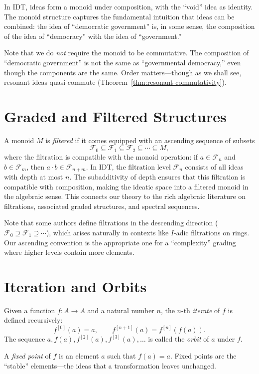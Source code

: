 \documentclass[11pt,openany]{book}
\theoremstyle{definition}
\theoremstyle{plain}
\theoremstyle{remark}
\newcommand{\Filt}[1]{\mathcal{F}_{#1}}     %
\begin{document}
In IDT, ideas form a monoid under composition, with the ``void'' idea as identity. The monoid structure captures the fundamental intuition that ideas can be combined: the idea of ``democratic government'' is, in some sense, the composition of the idea of ``democracy'' with the idea of ``government.''

Note that we do \emph{not} require the monoid to be commutative. The composition of ``democratic government'' is not the same as ``governmental democracy,'' even though the components are the same. Order matters---though as we shall see, resonant ideas quasi-commute (Theorem~\ref{thm:resonant-commutativity}).

\section{Graded and Filtered Structures}

A monoid $M$ is \emph{filtered} if it comes equipped with an ascending sequence of subsets
\[
\Filt{0} \subseteq \Filt{1} \subseteq \Filt{2} \subseteq \cdots \subseteq M,
\]
where the filtration is compatible with the monoid operation: if $a \in \Filt{n}$ and $b \in \Filt{m}$, then $a \cdot b \in \Filt{n+m}$. In IDT, the filtration level $\Filt{n}$ consists of all ideas with depth at most $n$. The subadditivity of depth ensures that this filtration is compatible with composition, making the ideatic space into a filtered monoid in the algebraic sense. This connects our theory to the rich algebraic literature on filtrations, associated graded structures, and spectral sequences.

Note that some authors define filtrations in the descending direction ($\Filt{0} \supseteq \Filt{1} \supseteq \cdots$), which arises naturally in contexts like $I$-adic filtrations on rings. Our ascending convention is the appropriate one for a ``complexity'' grading where higher levels contain more elements.

\section{Iteration and Orbits}

Given a function $f : A \to A$ and a natural number $n$, the $n$-th \emph{iterate} of $f$ is defined recursively:
\[
f^{[0]}(a) = a, \qquad f^{[n+1]}(a) = f^{[n]}(f(a)).
\]
The sequence $a, f(a), f^{[2]}(a), f^{[3]}(a), \ldots$ is called the \emph{orbit} of $a$ under $f$.

A \emph{fixed point} of $f$ is an element $a$ such that $f(a) = a$. Fixed points are the ``stable'' elements---the ideas that a transformation leaves unchanged.
\end{document}
